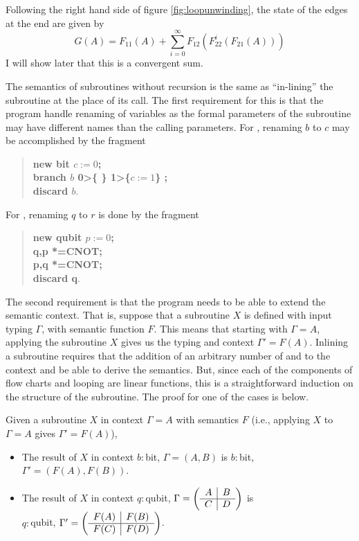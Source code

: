 Following the right hand side of figure \ref{fig:loopunwinding}, the state of the edges at the end
are given by
\begin{equation}
  G(A) = F_{11}(A)+\sum_{i=0}^{\infty}F_{12}(F^{i}_{22}(F_{21}(A)))\label{eqn:loopunwinding}
\end{equation}
I will show later that this is a convergent sum.

The semantics of subroutines without recursion is the same as ``in-lining'' the subroutine at the
place of its call. The first requirement for this is that the program handle renaming of variables
as the formal parameters of the subroutine may have different names than the calling parameters.
For \bits, renaming $b$ to $c$ may be accomplished by the fragment
\begin{quote}
  \textbf{new bit $c:=0$;\\  branch $b$ 0>\{ \} 1>\{$c:=1$\} ;\\
   discard $b$}.
\end{quote}
For \qbits, renaming $q$ to $r$ is done by the fragment
\begin{quote}
  \textbf{new qubit $p :=0$; \\
  q,p *=CNOT; \\
  p,q *=CNOT; \\
  discard q}.
\end{quote}
The second requirement is that the program needs to be able to extend the semantic context. That
is, suppose that a subroutine $X$ is defined with input typing $\Gamma$, with semantic function
$F$. This means that starting with $\Gamma=A$, applying the subroutine $X$ gives us the typing and
context $\Gamma'=F(A)$. Inlining a subroutine requires that the addition of an arbitrary number of
\bits and \qbits to the context and be able to derive the semantics. But, since each of the
components of flow charts and looping are linear functions, this is a straightforward induction on
the structure of the subroutine. The proof for one of the cases is below.
\begin{lemma}\label{lemma:contextextension}
Given a subroutine $X$ in context $\Gamma=A$ with semantics $F$ (i.e., applying $X$ to $\Gamma=A$
gives $\Gamma'=F(A)$),
\begin{itemize}
  \item{} The result of $X$ in context $b:$bit, $\Gamma=(A,B)$ is $b:$bit, $\Gamma'=(F(A),F(B))$.
  \item{} The result of $X$ in context $q:$qubit, $\Gamma=\qsmat{A}{B}{C}{D}$ is\\ $q:$qubit, $\Gamma'=\qsmat{F(A)}{F(B)}{F(C)}{F(D)}$.
\end{itemize}
\end{lemma}
